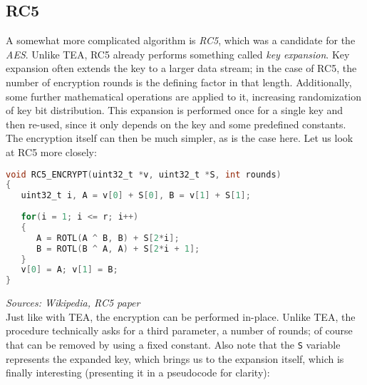 \documentclass[a4paper,10pt,openright]{memoir}
\newcommand{\term}[1]{\textit{#1}}
\newcommand{\code}[1]{\texttt{#1}}
\begin{document}
\subsection{RC5}

A somewhat more complicated algorithm is \term{RC5}, which was a 
candidate for the \term{AES}. Unlike TEA, RC5 already performs 
something called \term{key expansion}. Key expansion often extends the 
key to a larger data stream; in the case of RC5, the number of 
encryption rounds is the defining factor in that length. Additionally, 
some further mathematical operations are applied to it, increasing 
randomization of key bit distribution. This expansion is performed once 
for a single key and then re-used, since it only depends on the key and 
some predefined constants. The encryption itself can then be much 
simpler, as is the case here. Let us look at RC5 more closely:

\begin{lstlisting}[language=C]
void RC5_ENCRYPT(uint32_t *v, uint32_t *S, int rounds)
{
   uint32_t i, A = v[0] + S[0], B = v[1] + S[1];
   
   for(i = 1; i <= r; i++)
   {
      A = ROTL(A ^ B, B) + S[2*i];
      B = ROTL(B ^ A, A) + S[2*i + 1];
   }
   v[0] = A; v[1] = B;
}
\end{lstlisting}
\textit{\footnotesize Sources: Wikipedia, RC5 paper}\\

Just like with TEA, the encryption can be performed in-place. Unlike 
TEA, the procedure technically asks for a third parameter, a number of 
rounds; of course that can be removed by using a fixed constant. Also 
note that the \code{S} variable represents the expanded key, which 
brings us to the expansion itself, which is finally interesting 
(presenting it in a pseudocode for clarity):
\end{document}
